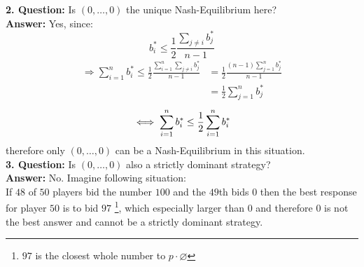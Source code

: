 \begin{example}
	\textbf{2. Question:} Is $(0, \dotsc, 0)$ the unique Nash-Equilibrium here? \\
	\textbf{Answer:} Yes, since:	
	\[ b_{i}^{*} \leq \frac{1}{2} \frac{\sum_{j \neq i} b_{j}^{*}}{n - 1} \]
	\begin{align*}
		\Rightarrow \sum_{i = 1}^{n} b_{i}^{*} \leq \frac{1}{2} \frac{\sum_{i = 1}^{n} \sum_{j \neq i} b_{j}^{*}}{n - 1} & = \frac{1}{2} \frac{(n - 1) \sum_{j = 1}^{n} b_{j}^{*}}{n - 1} \\
		& = \frac{1}{2} \sum_{j = 1}^{n} b_{j}^{*}
	\end{align*} 
	\[ \iff \sum_{i = 1}^{n} b_{i}^{*} \leq \frac{1}{2} \sum_{i = 1}^{n} b_{i}^{*} \]
	therefore only $(0, \dotsc,  0)$ can be a Nash-Equilibrium in this situation. \\


	\textbf{3. Question:} Is $(0, \dotsc, 0)$ also a strictly dominant strategy? \\
	\textbf{Answer:} No. Imagine following situation: \\
	If $48$ of $50$ players bid the number $100$ and the $49$th bids $0$ then the best response for player $50$ is to bid $97$ \footnote{$97$ is the closest whole number to $p \cdot \varnothing$}, which especially larger than 0 and therefore $0$ is not the best answer and cannot be a strictly dominant strategy.
\end{example}


\newpage